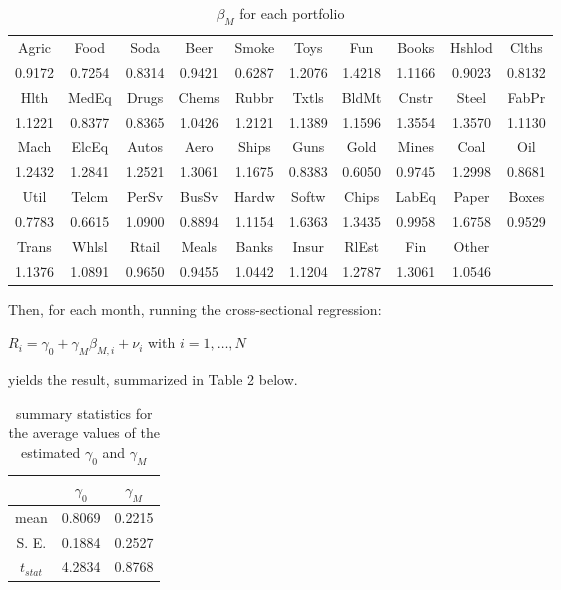 \documentclass{report}
\begin{document}
\begin{table}[ht]
\centering
\caption{$\beta_M$ for each portfolio}
\begin{tabular}{c | c | c | c | c | c | c | c | c | c}
\hline\hline
Agric		& Food	& Soda	& Beer	& Smoke	& Toys	& Fun	& Books	& Hshlod	& Clths	\\	
0.9172	& 0.7254	& 0.8314	& 0.9421	& 0.6287	& 1.2076	& 1.4218	& 1.1166	& 0.9023	& 0.8132	\\	[0.5ex] \hline

Hlth		& MedEq	& Drugs	& Chems	& Rubbr	& Txtls	& BldMt	& Cnstr	& Steel	& FabPr	\\	
1.1221	& 0.8377	& 0.8365	& 1.0426	& 1.2121	& 1.1389	& 1.1596	& 1.3554	& 1.3570	& 1.1130	\\	[0.5ex] \hline

Mach		& ElcEq	& Autos	& Aero	& Ships	& Guns	& Gold	& Mines	& Coal	& Oil		\\	
1.2432	& 1.2841	& 1.2521	& 1.3061	& 1.1675	& 0.8383	& 0.6050	& 0.9745	& 1.2998	& 0.8681	\\	[0.5ex] \hline

Util		& Telcm	& PerSv	& BusSv	& Hardw	& Softw	& Chips	& LabEq	& Paper	& Boxes	\\	
0.7783	& 0.6615	& 1.0900	& 0.8894	& 1.1154	& 1.6363	& 1.3435	& 0.9958	& 1.6758	& 0.9529	\\	[0.5ex] \hline

Trans	& Whlsl	& Rtail	& Meals	& Banks	& Insur	& RlEst	& Fin		& Other	& 		\\	
1.1376	& 1.0891	& 0.9650	& 0.9455	& 1.0442	& 1.1204	& 1.2787	& 1.3061	& 1.0546	& 		\\	[1ex] \hline \hline
\end{tabular}
\end{table}

Then, for each month, running the cross-sectional regression:
\begin{center}
	$R_i = \gamma_0 + \gamma_M \beta_{M, i} + \nu_i$ with $i = 1, \dots, N$
\end{center}
yields the result, summarized in Table 2 below.

\begin{table}[ht]
\centering
\caption{summary statistics for the average values of the estimated $\gamma_0$ and $\gamma_M$}
\begin{tabular}{c | c | c}
		& $\gamma_0$	& $\gamma_M$	\\	[0.5ex] 	\hline
mean	& 0.8069		& 0.2215		\\
S. E.		& 0.1884		& 0.2527		\\
$t_{stat}$	& 4.2834		& 0.8768		\\ 	[0.5ex]	\hline \hline
\end{tabular}
\end{table}
\end{document}
